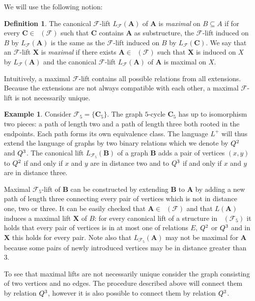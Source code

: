 \documentclass{elsarticle}
\def\Forb{\mathop{\mathrm{Forb_{he}}}\nolimits}
\def\str#1{\mathbf {#1}}
\def\extl#1#2{Q\ifstrempty{#1}{}{_{#1}}\ifstrempty{#2}{}{^{#2}}}
\def\ext#1#2{\extl{\ifstrempty{#1}{}{\str{#1}}}{#2}}
\def\F{{\mathcal F}}
\theoremstyle{plain}
\theoremstyle{definition}
\newtheorem{definition}[theorem]{Definition}
\newtheorem{example}[theorem]{Example}
\theoremstyle{remark}
\begin{document}
We will use the following notion:
\begin{definition}
\label{defn:maximal}
The canonical $\F$-lift $L_\F({\str A})$ of $\str A$ is \emph{maximal} on $B\subseteq A$ if for every  $\str{C}\in \Forb(\F)$
such that $\str{C}$ contains $\str{A}$ as substructure, the $\F$-lift induced on $B$ by $L_\F(\str{A})$ is
the same as the $\F$-lift induced on $B$ by $L_\F(\str{C})$.
We say that an $\F$-lift $\str{X}$ is \emph{maximal} if there exists $\str{A}\in
\Forb(\F)$ such that $\str{X}$ is induced on $X$ by $L_\F(\str{A})$ and the
canonical $\F$-lift $L_\F(\str{A})$ of $\str A$ is maximal on $X$.
\end{definition}
Intuitively, a maximal $\F$-lift contains all possible relations from all extensions. Because the extensions are not
always compatible with each other, a maximal $\F$-lift is not necessarily unique. 
\begin{example}
\label{example:5cycle}
Consider $\mathcal F_5=\{\str{C}_5\}$. The graph $5$-cycle $\str{C}_5$ has up
to isomorphism two pieces: a path of length two and a path of length three both
rooted in the endpoints.  Each path forms its own equivalence class.  The
language $L^+$ will thus extend the language of graphs by two binary relations which
we denote by $\ext{}{2}$ and $\ext{}{3}$.  The canonical lift $L_{\mathcal F_5}(\str{B})$ of a graph $\str{B}$ adds a pair of vertices $(x,y)$ to $\ext{}{2}$
if and only if $x$ and $y$ are in distance two and to $\ext{}{3}$ if and only if
$x$ and $y$ are in distance three. 

Maximal $\F_5$-lift of $\str{B}$ can be constructed by extending $\str{B}$ to
$\str{A}$ by adding a new path of length three connecting every pair of vertices
which is not in distance one, two or three. It can be easily checked that $\str{A}\in
\Forb(\F)$ and that $L(\str{A})$ induces a maximal lift $\str{X}$ of $B$: for
every canonical lift of a structure in $\Forb(\F_5)$ it holds that every pair of
vertices is in at most one of relations $E$, $\ext{}{2}$ or $\ext{}{3}$ and in
$\str{X}$ this holds for every pair. Note also that ${L_{\F_5}}(\str{A})$ may not be maximal
for $\str{A}$ because some pairs of newly introduced vertices may be in distance greater than 3.

To see that maximal lifts are not necessarily unique consider the graph consisting of two vertices and no edges.
The procedure described above will connect them by relation $\ext{}{3}$, however it is also possible
to connect them by relation $\ext{}{2}$.
\end{example}
\end{document}
